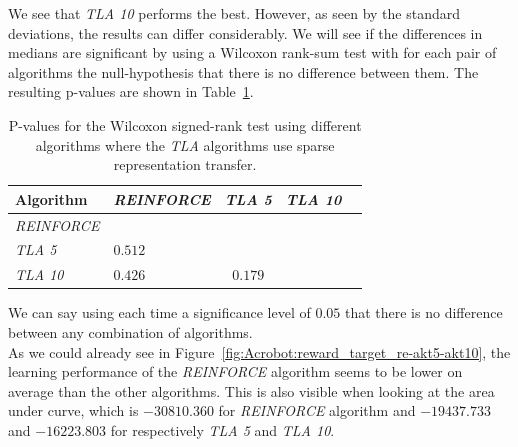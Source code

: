 We see that \textit{TLA 10} performs the best. However, as seen by the standard deviations, the results can differ considerably. We will see if the differences in medians are significant by using a Wilcoxon rank-sum test with for each pair of algorithms the null-hypothesis that there is no difference between them.
The resulting p-values are shown in Table~\ref{tab:sparse:pvalues}.
\begin{table}[htb]
    \centering
    \begin{tabular}{llccc}
    \hline
    Algorithm & \textit{REINFORCE} & \textit{TLA 5} & \textit{TLA 10} \\
    \hline
       \textit{REINFORCE}  & & & \\
       \textit{TLA 5} & $0.512$ & & \\
       \textit{TLA 10} & $0.426$ & $0.179$ & \\
    \hline
    \end{tabular}
    \caption{P-values for the Wilcoxon signed-rank test using different algorithms where the \textit{TLA} algorithms use sparse representation transfer.}
    \label{tab:sparse:pvalues}
\end{table}
We can say using each time a significance level of $0.05$ that there is no difference between any combination of algorithms.\\

As we could already see in Figure~\ref{fig:Acrobot:reward_target_re-akt5-akt10}, the learning performance of the \textit{REINFORCE} algorithm seems to be lower on average than the other algorithms.
This is also visible when looking at the area under curve, which is $-30810.360$ for \textit{REINFORCE} algorithm and $-19437.733$ and $-16223.803$ for respectively \textit{TLA 5} and \textit{TLA 10}.\\

